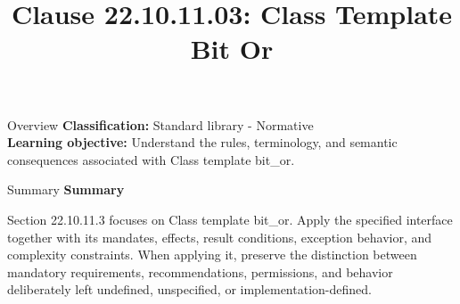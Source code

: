 \documentclass[10pt,letterpaper]{article}
\title{Clause 22.10.11.03: Class Template Bit Or}
\author{}
\date{}
\begin{document}
\maketitle
\begin{CornellOverviewBox}{Overview}
\textbf{Classification:} Standard library - Normative\\[2pt]
\textbf{Learning objective:} Understand the rules, terminology, and semantic consequences associated with Class template bit\_or.
\end{CornellOverviewBox}\begin{CornellSummaryBox}{Summary}
{\sffamily\bfseries\color{Accent} Summary}\par\vspace{3pt}Section 22.10.11.3 focuses on Class template bit\_or. Apply the specified interface together with its mandates, effects, result conditions, exception behavior, and complexity constraints. When applying it, preserve the distinction between mandatory requirements, recommendations, permissions, and behavior deliberately left undefined, unspecified, or implementation-defined.
\end{CornellSummaryBox}
\end{document}

